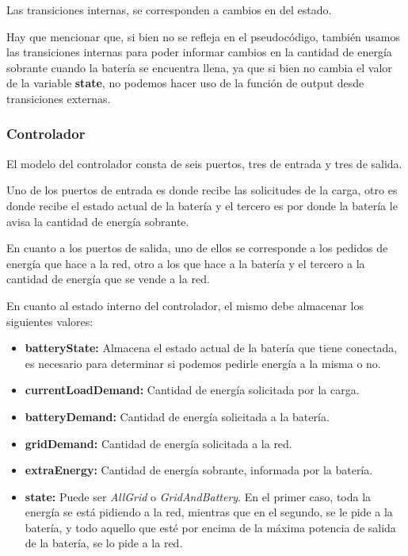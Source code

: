 Las transiciones internas, se corresponden a cambios en del estado.



Hay que mencionar que, si bien no se refleja en el pseudocódigo, también usamos las
transiciones internas para poder informar cambios en la cantidad de energía sobrante cuando
la batería se encuentra llena, ya que si bien no cambia el valor de la variable \textbf{state},
no podemos hacer uso de la función de output desde transiciones externas.

\subsubsection{Controlador}

El modelo del controlador consta de seis puertos, tres de entrada y tres de salida.

Uno de los puertos de entrada es donde recibe las solicitudes de la carga, otro
es donde recibe el estado actual de la batería y el tercero es por donde la batería 
le avisa la cantidad de energía sobrante.

En cuanto a los puertos de salida, uno de ellos se corresponde a los pedidos de 
energía que hace a la red, otro a los que hace a la batería y el tercero a la cantidad de 
energía que se vende a la red.

En cuanto al estado interno del controlador, el mismo debe almacenar los siguientes valores:

\begin{itemize}
    \item \textbf{batteryState:} Almacena el estado actual de la batería que tiene conectada,
    es necesario para determinar si podemos pedirle energía a la misma o no.
    \item \textbf{currentLoadDemand:} Cantidad de energía solicitada por la carga.
    \item \textbf{batteryDemand:} Cantidad de energía solicitada a la batería.
    \item \textbf{gridDemand:} Cantidad de energía solicitada a la red.
    \item \textbf{extraEnergy:} Cantidad de energía sobrante, informada por la batería.
    \item \textbf{state:} Puede ser \emph{AllGrid} o \emph{GridAndBattery}. En el primer
        caso, toda la energía se está pidiendo a la red, mientras que en el segundo, se
        le pide a la batería, y todo aquello que esté por encima de la máxima potencia
        de salida de la batería, se lo pide a la red.
\end{itemize}

